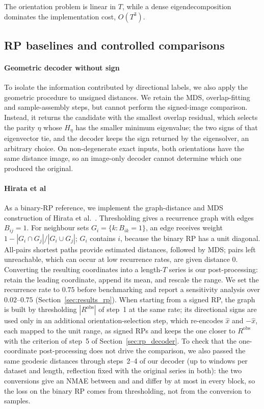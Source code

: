 \documentclass[preprint,review,12pt]{elsarticle}
\begin{document}
The orientation problem is linear in $T$, while a dense eigendecomposition dominates the implementation cost, $O(T^3)$.

\subsection{RP baselines and controlled comparisons}\label{sec:hirata}

\paragraph{Geometric decoder without sign}
To isolate the information contributed by directional labels, we also apply the geometric procedure to unsigned distances. We retain the MDS, overlap-fitting and sample-assembly steps, but cannot perform the signed-image comparison. Instead, it returns the candidate with the smallest overlap residual, which selects the parity $\eta$ whose $H_\eta$ has the smaller minimum eigenvalue; the two signs of that eigenvector tie, and the decoder keeps the sign returned by the eigensolver, an arbitrary choice. On non-degenerate exact inputs, both orientations have the same distance image, so an image-only decoder cannot determine which one produced the original.

\paragraph{Hirata et al}
As a binary-RP reference, we implement the graph-distance and MDS construction of Hirata et al.~\cite{hirata2008reproduction,hirata2016chromosome}. Thresholding gives a recurrence graph with edges $B_{ij}=1$. For neighbour sets $G_i=\{k:B_{ik}=1\}$, an edge receives weight $1-|G_i\cap G_j|/|G_i\cup G_j|$; $G_i$ contains $i$, because the binary RP has a unit diagonal. All-pairs shortest paths provide estimated distances, followed by MDS; pairs left unreachable, which can occur at low recurrence rates, are given distance $0$. Converting the resulting coordinates into a length-$T$ series is our post-processing: retain the leading coordinate, append its mean, and rescale the range. We set the recurrence rate to $0.75$ before benchmarking and report a sensitivity analysis over $0.02$--$0.75$ (Section~\ref{sec:results_rp}). When starting from a signed RP, the graph is built by thresholding $|R^{\mathrm{obs}}|$ of step~1 at the same rate; its directional signs are used only in an additional orientation-selection step, which re-encodes $\hat x$ and $-\hat x$, each mapped to the unit range, as signed RPs and keeps the one closer to $R^{\mathrm{obs}}$ with the criterion of step~5 of Section~\ref{sec:rp_decoder}. To check that the one-coordinate post-processing does not drive the comparison, we also passed the same geodesic distances through steps~2--4 of our decoder (up to \binaryWindows{} windows per dataset and length, reflection fixed with the original series in both): the two conversions give an NMAE between \binaryOracleMin{} and \binaryOracleMax{} and differ by at most \binaryGapMax{} in every block, so the loss on the binary RP comes from thresholding, not from the conversion to samples.
\end{document}
